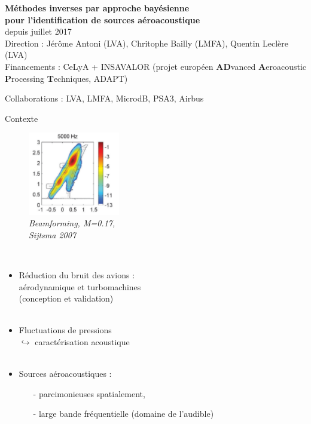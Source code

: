 \begin{frame}
	\centering
	\textbf{ Méthodes inverses par approche bayésienne \\pour l'identification de sources aéroacoustique}\\
	\footnotesize{depuis juillet 2017}\\[0.5cm]
	Direction : Jérôme Antoni (LVA), Chritophe Bailly (LMFA), Quentin Leclère (LVA)\\[0.5cm]
	Financements : CeLyA + INSAVALOR (projet européen \textbf{AD}vanced \textbf{A}eroacoustic \textbf{P}rocessing \textbf{T}echniques, ADAPT)

	Collaborations : LVA, LMFA, MicrodB, PSA3, Airbus
\end{frame}


\begin{frame}{Contexte}
		\begin{figure}
			\centering
			\vspace{-0.9cm}\includegraphics[width=4cm]{img/bf_sijtsma.png}\\
			\scriptsize{\itshape Beamforming, M=0.17,\\Sijtsma 2007}
			\vspace{-3cm}
		\end{figure}~
		\begin{itemize}
			\item Réduction du bruit des avions  : \\ aérodynamique et turbomachines\\   (conception et validation)\\~\\
			\item Fluctuations de pressions\\ $\hookrightarrow$ caractérisation acoustique\\~\\
			\item Sources aéroacoustiques : 
				\begin{itemize}
					\item[-] parcimonieuses spatialement,
					\item[-]  large bande fréquentielle (domaine de l'audible)

\end{itemize}
\end{itemize}
\end{frame}
